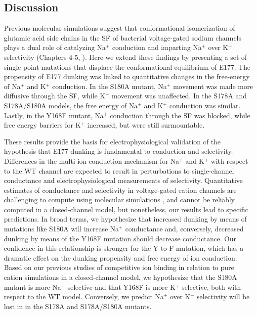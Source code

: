\begin{refsection}
\section{Discussion}
Previous molecular simulations suggest that conformational isomerization of glutamic acid side chains in the SF of bacterial voltage-gated sodium channels plays a dual role of catalyzing Na$^+$ conduction and imparting Na$^+$ over K$^+$ selectivity (Chapters 4-5, \cite{Chakrabarti:2013kd}). Here we extend these findings by presenting a set of single-point mutations that displace the conformational equilibrium of E177. The propensity of E177 dunking was linked to quantitative changes in the free-energy of Na$^+$ and K$^+$ conduction. In the S180A mutant, Na$^+$ movement was made more diffusive through the SF, while K$^+$ movement was unaffected. In the S178A and S178A/S180A models, the free energy of Na$^+$ and K$^+$ conduction was similar. Lastly, in the Y168F mutant, Na$^+$ conduction through the SF was blocked, while free energy barriers for K$^+$ increased, but were still surmountable.

These results provide the basis for electrophysiological validation of the hypothesis that E177 dunking is fundamental to conduction and selectivity. Differences in the multi-ion conduction mechanism for Na$^+$ and K$^+$ with respect to the WT channel are expected to result in perturbations to single-channel conductance and electrophysiological measurements of selectivity. Quantitative estimates of conductance and selectivity in voltage-gated cation channels are challenging to compute using molecular simulations \cite{Jensen:2013gn}, and cannot be reliably computed in a closed-channel model, but nonetheless, our results lead to specific predictions. In broad terms, we hypothesize that increased dunking by means of mutations like S180A will increase Na$^+$ conductance and, conversely, decreased dunking by means of the Y168F mutation should decrease conductance. Our confidence in this relationship is stronger for the Y to F mutation, which has a dramatic effect on the dunking propensity and free energy of ion conduction. Based on our previous studies of competitive ion binding in relation to pure cation simulations in a closed-channel model, we hypothesize that the S180A mutant is more Na$^+$ selective and that Y168F is more K$^+$ selective, both with respect to the WT model. Conversely, we predict Na$^+$ over K$^+$ selectivity will be lost in in the S178A and S178A/S180A mutants.


\end{refsection}
